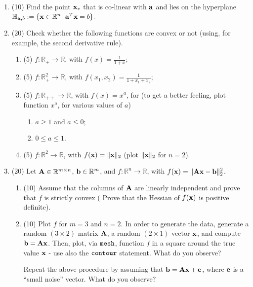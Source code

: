 \documentclass[12pt]{article}
\begin{document}
\begin{enumerate}
\begin{enumerate}
\item 
{\color{blue} (15)} Prove that $\mathbb{S}_{{\bf a}, b}$ is {\em not}\/ affine ({\color{blue} a counterexample is sufficient}).

\end{enumerate}


\item {\color{blue} (10)}
Find the point ${\bf x}_*$ that is co-linear with ${\bf a}$ and lies on the hyperplane 
$\mathbb{H}_{{\bf a}, b}:=\{ {\bf x}\in\mathbb{R}^n\,|\, {\bf a}^T {\bf x}=b\}$.


\item 
(20) Check whether the following functions are convex or not  (using, for example, the second derivative rule).
\begin{enumerate}
\item {\color{blue} (5)} 
$f:\mathbb{R}_{+}\rightarrow \mathbb{R}$, with $f(x)=\frac{1}{1+x}$;

\item 
{\color{blue} (5)} $f:\mathbb{R}_+^2 \rightarrow \mathbb{R}$, with $f(x_1,x_2) = \frac{1}{1+x_1+x_2}$;

\item 
{\color{blue} (5)} $f:\mathbb{R}_{++} \rightarrow \mathbb{R}$, with $f(x)=x^a$, for (to get a better feeling, 
plot function $x^a$, for various values of $a$)
\begin{enumerate}
\item 
$a\ge 1$ and $a\le 0$;
\item 
$0\le a \le 1$.
\end{enumerate}

\item 
{\color{blue} (5)} $f:\mathbb{R}^2 \rightarrow \mathbb{R}$, with $f({\bf x}) = \|{\bf x}\|_2$ (plot $\|{\bf x}\|_2$ for $n=2$).

\end{enumerate}

\item (20) 
Let ${\bf A}\in\mathbb{R}^{m\times n}$, ${\bf b}\in\mathbb{R}^m$, and $f:\mathbb{R}^n\rightarrow \mathbb{R}$, with
$f({\bf x}) = \|{\bf Ax}-{\bf b}\|_2^2$. 
\begin{enumerate}
\item {\color{blue} (10)}
Assume that the columns of ${\bf A}$ are linearly independent and prove that $f$ is strictly convex
({\color{blue} Prove that the Hessian of $f({\bf x})$ is positive definite}).

\item {\color{blue} (10)} Plot $f$ for $m=3$ and $n=2$. In order to generate the data, generate a random $(3\times 2)$ matrix ${\bf A}$,
a random $(2\times 1)$ vector ${\bf x}$, and compute ${\bf b}={\bf Ax}$. Then, plot, via ${\tt mesh}$, function $f$ in a 
square around the true value ${\bf x}$ - use also the ${\tt contour}$ statement. What do you observe?


Repeat the above procedure by assuming that ${\bf b}={\bf Ax}+{\bf e}$, where ${\bf e}$ is a ``small noise'' vector. What do you observe?
\end{enumerate}

\end{enumerate}
\end{document}
